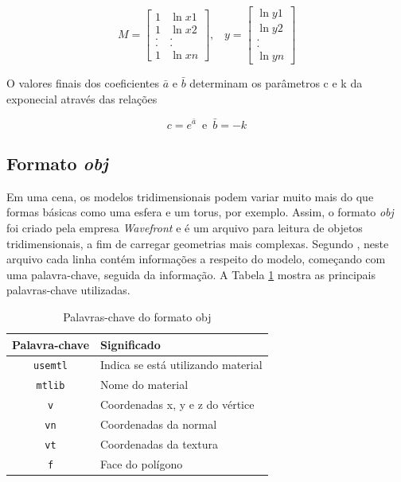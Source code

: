 {	\begin{equation}
	M = \left[\begin{array}{cc}
               	1 &  \ln{x1} \\
               	1 & \ln{x2}  \\
		. & .  \\
               	. & .  \\
		1 & \ln{xn}
          	         \end{array}\right] \mbox{,} \quad
	y = \left[\begin{array}{c}
               	\ln{y1} \\
               	\ln{y2}  \\
		.   \\
               	.   \\
		\ln{yn}
          	         \end{array}\right] 
	\label{nvar}
	\end{equation}

	O valores finais dos coeficientes $\bar{a}$ e $\bar{b}$ determinam os parâmetros c e k da exponecial através das relações

	\begin{equation}
	c = e^{\bar{a}}\, \, \, \mbox{e}\, \, \,\bar{b} = -k
	\end{equation} 


\subsection{Formato \textit{obj}}
\label{formatobj}

	Em uma cena, os modelos tridimensionais podem variar muito mais do que formas básicas como uma esfera e um torus, por exemplo. Assim, o formato \textit{obj} foi criado pela empresa  \textit{Wavefront} e é um arquivo para leitura de objetos tridimensionais, a fim de carregar geometrias mais complexas. Segundo \cite{graphicsprog}, neste arquivo cada linha contém informações a respeito do modelo, começando com uma palavra-chave, seguida da informação. A  Tabela \ref{palavraschave} mostra as principais palavras-chave utilizadas. 

\begin{table}[h]
	\centering	
	\begin{tabular}{cl}
		\toprule
		\textbf{Palavra-chave} & \textbf{Significado}  \\
		\midrule
		\texttt{usemtl} & Indica se está utilizando material  \\
		\texttt{mtlib} &  Nome do material \\
		\texttt{v} &  Coordenadas x, y e z do vértice \\
		\texttt{vn} & Coordenadas da normal \\
		\texttt{vt} &  Coordenadas da textura \\
		\texttt{f} &  Face do polígono \\
		\bottomrule
	\end{tabular}
	\caption{ Palavras-chave do formato obj}
	\label{palavraschave}
\end{table}

}
